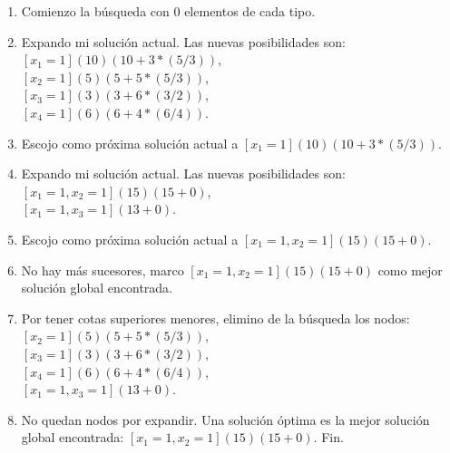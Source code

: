 \documentclass{article}
\begin{document}
\begin{enumerate}

\item Comienzo la búsqueda con $0$ elementos de cada tipo.

\item Expando mi solución actual. Las nuevas posibilidades son: \\
$[x_1=1] (10)(10+3*(5/3))$,\\
$[x_2=1] (5)(5+5*(5/3))$,\\
$[x_3=1] (3)(3+6*(3/2))$,\\
$[x_4=1] (6)(6+4*(6/4))$.

\item Escojo como próxima solución actual a $[x_1=1] (10)(10+3*(5/3))$.

\item Expando mi solución actual. Las nuevas posibilidades son:\\
$[x_1=1,x_2=1] (15)(15+0)$,\\
$[x_1=1,x_3=1] (13+0)$.

\item Escojo como próxima solución actual a $[x_1=1,x_2=1] (15)(15+0)$.

\item No hay más sucesores, marco $[x_1=1,x_2=1] (15)(15+0)$ como mejor solución global encontrada.

\item Por tener cotas superiores menores, elimino de la búsqueda los nodos:\\
$[x_2=1] (5)(5+5*(5/3))$,\\
$[x_3=1] (3)(3+6*(3/2))$,\\
$[x_4=1] (6)(6+4*(6/4))$,\\
$[x_1=1,x_3=1] (13+0)$.

\item No quedan nodos por expandir. Una solución óptima es la mejor solución global encontrada: $[x_1=1,x_2=1] (15)(15+0)$. Fin.

\end{enumerate}
\end{document}
